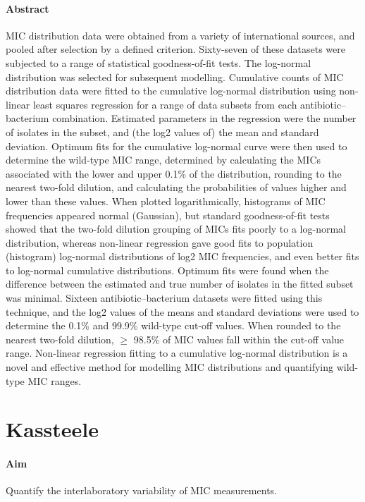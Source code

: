 \documentclass[a4paper]{article}
\begin{document}
\paragraph{Abstract} MIC distribution data were obtained from a variety of international sources, and pooled after selection by a defined criterion. Sixty-seven of these datasets were subjected to a range of statistical goodness-of-fit tests. The log-normal distribution was selected for subsequent modelling. Cumulative counts of MIC distribution data were fitted to the cumulative log-normal distribution using non-linear least squares regression for a range of data subsets from each antibiotic–bacterium combination. Estimated parameters in the regression were the number of isolates in the subset, and (the log2 values of) the mean and standard deviation. Optimum fits for the cumulative log-normal curve were then used to determine the wild-type MIC range, determined by calculating the MICs associated with the lower and upper 0.1\% of the distribution, rounding to the nearest two-fold dilution, and calculating the probabilities of values higher and lower than these values. When plotted logarithmically, histograms of MIC frequencies appeared normal (Gaussian), but standard goodness-of-fit tests showed that the two-fold dilution grouping of MICs fits poorly to a log-normal distribution, whereas non-linear regression gave good fits to population (histogram) log-normal distributions of log2 MIC frequencies, and even better fits to log-normal cumulative distributions. Optimum fits were found when the difference between the estimated and true number of isolates in the fitted subset was minimal. Sixteen antibiotic–bacterium datasets were fitted using this technique, and the log2 values of the means and standard deviations were used to determine the 0.1\% and 99.9\% wild-type cut-off values. When rounded to the nearest two-fold dilution, $\geq$ 98.5\% of MIC values fall within the cut-off value range. Non-linear regression fitting to a cumulative log-normal distribution is a novel and effective method for modelling MIC distributions and quantifying wild-type MIC ranges.



\section{Kassteele \cite{Kassteele2012}}
\paragraph{Aim} Quantify the interlaboratory variability of MIC measurements.
\end{document}
